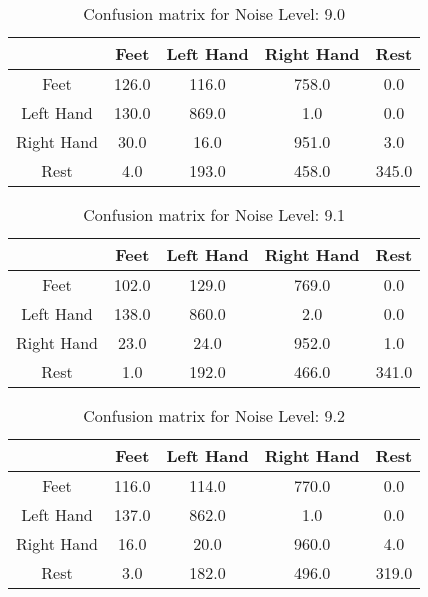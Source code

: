 \begin{table}[!htbp]
    \centering
    \begin{tabular}{|c||c|c|c|c|}
        \hline
		 & Feet & Left Hand & Right Hand & Rest \\
        \hline
        \hline
        Feet & 126.0 & 116.0 & 758.0 & 0.0 \\
        \hline
        Left Hand & 130.0 & 869.0 & 1.0 & 0.0 \\
        \hline
        Right Hand & 30.0 & 16.0 & 951.0 & 3.0 \\
        \hline
        Rest & 4.0 & 193.0 & 458.0 & 345.0 \\
        \hline
    \end{tabular}
    \caption{Confusion matrix for Noise Level: 9.0}
\end{table}

\begin{table}[!htbp]
    \centering
    \begin{tabular}{|c||c|c|c|c|}
        \hline
		 & Feet & Left Hand & Right Hand & Rest \\
        \hline
        \hline
        Feet & 102.0 & 129.0 & 769.0 & 0.0 \\
        \hline
        Left Hand & 138.0 & 860.0 & 2.0 & 0.0 \\
        \hline
        Right Hand & 23.0 & 24.0 & 952.0 & 1.0 \\
        \hline
        Rest & 1.0 & 192.0 & 466.0 & 341.0 \\
        \hline
    \end{tabular}
    \caption{Confusion matrix for Noise Level: 9.1}
\end{table}

\begin{table}[!htbp]
    \centering
    \begin{tabular}{|c||c|c|c|c|}
        \hline
		 & Feet & Left Hand & Right Hand & Rest \\
        \hline
        \hline
        Feet & 116.0 & 114.0 & 770.0 & 0.0 \\
        \hline
        Left Hand & 137.0 & 862.0 & 1.0 & 0.0 \\
        \hline
        Right Hand & 16.0 & 20.0 & 960.0 & 4.0 \\
        \hline
        Rest & 3.0 & 182.0 & 496.0 & 319.0 \\
        \hline
    \end{tabular}
    \caption{Confusion matrix for Noise Level: 9.2}
\end{table}

